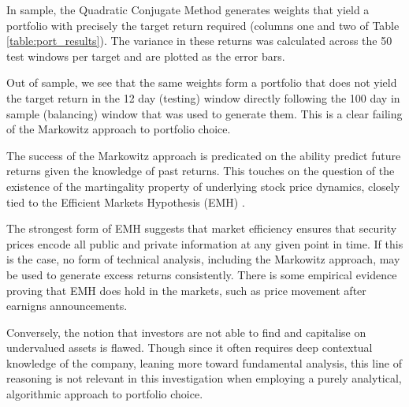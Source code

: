 \documentclass{article}
\begin{document}
In sample, the Quadratic Conjugate Method generates weights that yield a portfolio with precisely the target return required (columns one and two of Table \ref{table:port_results}). The variance in these returns was calculated across the 50 test windows per target and are plotted as the error bars. 

Out of sample, we see that the same weights form a portfolio that does not yield the target return in the 12 day (testing) window directly following the 100 day in sample (balancing) window that was used to generate them. This is a clear failing of the Markowitz approach to portfolio choice. 


The success of the Markowitz approach is predicated on the ability predict future returns given the knowledge of past returns. This touches on the question of the existence of the martingality property of underlying stock price dynamics, closely tied to the Efficient Markets Hypothesis (EMH) \cite{martingale}. 

The strongest form of EMH suggests that market efficiency ensures that security prices encode all public and private information at any given point in time. If this is the case, no form of technical analysis, including the Markowitz approach, may be used to generate excess returns consistently. There is some empirical evidence proving that EMH does hold in the markets, such as price movement after earnigns announcements. 

Conversely, the notion that investors are not able to find and capitalise on undervalued assets is flawed. Though since it often requires deep contextual knowledge of the company, leaning more toward fundamental analysis, this line of reasoning is not relevant in this investigation when employing a purely analytical, algorithmic approach to portfolio choice.
\end{document}
